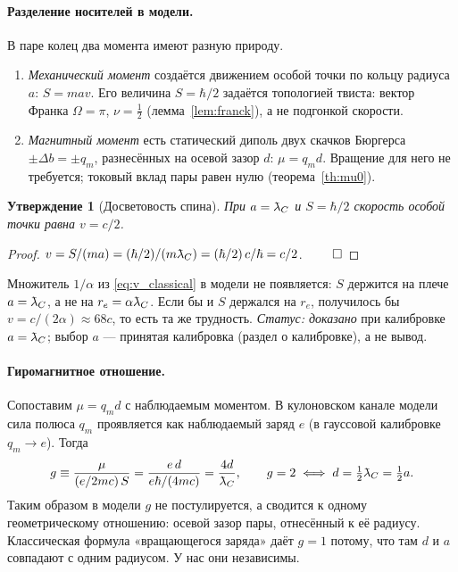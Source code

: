 \documentclass[12pt,a4paper]{article}
\newtheorem{proposition}{Утверждение}
\providecommand{\lambdabar}{{\mkern0.75mu\mathchar'26\mkern-9.75mu\lambda}}
\begin{document}
\paragraph{Разделение носителей в модели.} В паре колец два момента имеют
разную природу.
\begin{enumerate}[nosep]
\item \emph{Механический момент} создаётся движением особой точки по кольцу
радиуса $a$: $S=m a v$. Его величина $S=\hbar/2$ задаётся топологией твиста:
вектор Франка $\Omega=\pi$, $\nu=\tfrac12$ (лемма~\ref{lem:franck}), а не
подгонкой скорости.
\item \emph{Магнитный момент} есть статический диполь двух скачков Бюргерса
$\pm\Delta b=\pm q_m$, разнесённых на осевой зазор $d$: $\mu=q_m d$. Вращение
для него не требуется; токовый вклад пары равен нулю (теорема~\ref{th:mu0}).
\end{enumerate}

\begin{proposition}[Досветовость спина]
\label{prop:subluminal}
При $a=\lambdabar_C$ и $S=\hbar/2$ скорость особой точки равна $v=c/2$.
\end{proposition}
\begin{proof}
$v=S/(ma)=(\hbar/2)/(m\lambdabar_C)=(\hbar/2)\,c/\hbar=c/2$. $\qed$
\end{proof}
Множитель $1/\alpha$ из \eqref{eq:v_classical} в модели не появляется: $S$ держится
на плече $a=\lambdabar_C$, а не на $r_e=\alpha\lambdabar_C$. Если бы и $S$
держался на $r_e$, получилось бы $v=c/(2\alpha)\approx68c$, то есть та же трудность.
\emph{Статус: доказано} при калибровке $a=\lambdabar_C$; выбор $a$ --- принятая
калибровка (раздел о калибровке), а не вывод.

\paragraph{Гиромагнитное отношение.} Сопоставим $\mu=q_md$ с наблюдаемым моментом.
В кулоновском канале модели сила полюса $q_m$ проявляется как наблюдаемый заряд
$e$ (в гауссовой калибровке $q_m\to e$). Тогда
\begin{equation}
g\equiv\frac{\mu}{(e/2mc)\,S}=\frac{e\,d}{e\hbar/(4mc)}=\frac{4d}{\lambdabar_C},
\qquad
g=2\iff d=\tfrac12\lambdabar_C=\tfrac12a .
\label{eq:g_geometry}
\end{equation}
Таким образом в модели $g$ не постулируется, а сводится к одному геометрическому
отношению: осевой зазор пары, отнесённый к её радиусу. Классическая формула
«вращающегося заряда» даёт $g=1$ потому, что там $d$ и $a$ совпадают с одним
радиусом. У нас они независимы.
\end{document}
